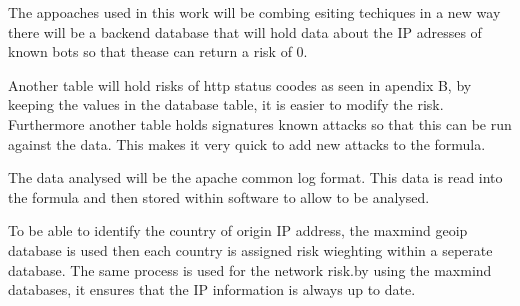 The appoaches used in this work will be combing esiting techiques in a new way there will be a backend database that will hold data about the IP adresses of known bots so that thease can return a risk of 0. 

Another table will hold risks of http status coodes as  seen in apendix B, by keeping the values in the database table, it is easier to modify the risk. Furthermore another table holds signatures known attacks so that this can be run against the data. This makes it very quick to add new attacks to the formula.

The data analysed will be the apache common log format. This data is read into the formula and then stored within software to allow to be analysed. 

To be able to identify the country of origin IP address, the maxmind geoip database is used then each country is assigned risk wieghting within a seperate database. The same process is used for the network risk.by using the maxmind databases, it ensures that the IP information is always up to date.